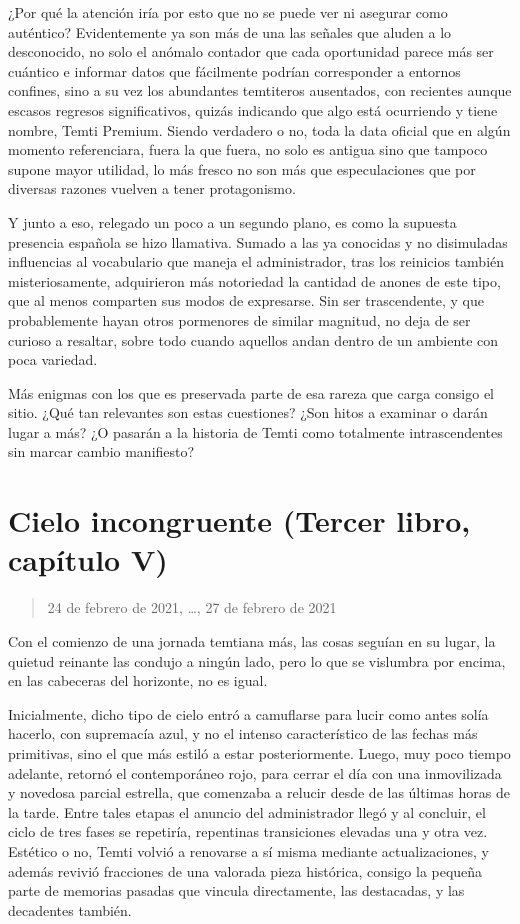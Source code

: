 \documentclass[
]{book}
\begin{document}
¿Por qué la atención iría por esto que no se puede ver ni asegurar como auténtico? Evidentemente ya son más de una las señales que aluden a lo desconocido, no solo el anómalo contador que cada oportunidad parece más ser cuántico e informar datos que fácilmente podrían corresponder a entornos confines, sino a su vez los abundantes temtiteros ausentados, con recientes aunque escasos regresos significativos, quizás indicando que algo está ocurriendo y tiene nombre, Temti Premium. Siendo verdadero o no, toda la data oficial que en algún momento referenciara, fuera la que fuera, no solo es antigua sino que tampoco supone mayor utilidad, lo más fresco no son más que especulaciones que por diversas razones vuelven a tener protagonismo.

Y junto a eso, relegado un poco a un segundo plano, es como la supuesta presencia española se hizo llamativa. Sumado a las ya conocidas y no disimuladas influencias al vocabulario que maneja el administrador, tras los reinicios también misteriosamente, adquirieron más notoriedad la cantidad de anones de este tipo, que al menos comparten sus modos de expresarse. Sin ser trascendente, y que probablemente hayan otros pormenores de similar magnitud, no deja de ser curioso a resaltar, sobre todo cuando aquellos andan dentro de un ambiente con poca variedad.

Más enigmas con los que es preservada parte de esa rareza que carga consigo el sitio. ¿Qué tan relevantes son estas cuestiones? ¿Son hitos a examinar o darán lugar a más? ¿O pasarán a la historia de Temti como totalmente intrascendentes sin marcar cambio manifiesto?

\hypertarget{cielo-incongruente-tercer-libro-capuxedtulo-v}{%
\section{Cielo incongruente (Tercer libro, capítulo V)}\label{cielo-incongruente-tercer-libro-capuxedtulo-v}}

\begin{quote}
24 de febrero de 2021, \ldots, 27 de febrero de 2021
\end{quote}

Con el comienzo de una jornada temtiana más, las cosas seguían en su lugar, la quietud reinante las condujo a ningún lado, pero lo que se vislumbra por encima, en las cabeceras del horizonte, no es igual.

Inicialmente, dicho tipo de cielo entró a camuflarse para lucir como antes solía hacerlo, con supremacía azul, y no el intenso característico de las fechas más primitivas, sino el que más estiló a estar posteriormente. Luego, muy poco tiempo adelante, retornó el contemporáneo rojo, para cerrar el día con una inmovilizada y novedosa parcial estrella, que comenzaba a relucir desde de las últimas horas de la tarde. Entre tales etapas el anuncio del administrador llegó y al concluir, el ciclo de tres fases se repetiría, repentinas transiciones elevadas una y otra vez. Estético o no, Temti volvió a renovarse a sí misma mediante actualizaciones, y además revivió fracciones de una valorada pieza histórica, consigo la pequeña parte de memorias pasadas que vincula directamente, las destacadas, y las decadentes también.
\end{document}
